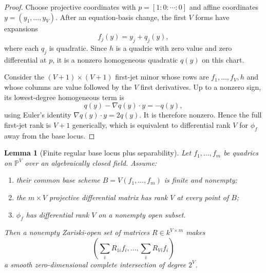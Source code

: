 \documentclass[10pt,a4paper]{article}
\newtheorem{lemma}[theorem]{Lemma}
\newcommand{\PP}{\mathbb P}
\begin{document}
\begin{proof}
Choose projective coordinates with $p=[1:0:\cdots:0]$ and affine coordinates $y=(y_1,\ldots,y_V)$.  After an equation-basis change, the first $V$ forms have expansions
\[
f_j(y)=y_j+q_j(y),
\]
where each $q_j$ is quadratic.  Since $h$ is a quadric with zero value and zero differential at $p$, it is a nonzero homogeneous quadratic $q(y)$ on this chart.

Consider the $(V+1)\times(V+1)$ first-jet minor whose rows are $f_1,\ldots,f_V,h$ and whose columns are value followed by the $V$ first derivatives.  Up to a nonzero sign, its lowest-degree homogeneous term is
\[
q(y)-\nabla q(y)\cdot y=-q(y),
\]
using Euler's identity $\nabla q(y)\cdot y=2q(y)$.  It is therefore nonzero.  Hence the full first-jet rank is $V+1$ generically, which is equivalent to differential rank $V$ for $\phi_f$ away from the base locus.
\end{proof}

\begin{lemma}[Finite regular base locus plus separability]\label{lem:finite-base-mixing}
Let $f_1,\ldots,f_m$ be quadrics on $\PP^V$ over an algebraically closed field.  Assume:
\begin{enumerate}
\item their common base scheme $B=V(f_1,\ldots,f_m)$ is finite and nonempty;
\item the $m\times V$ projective differential matrix has rank $V$ at every point of $B$;
\item $\phi_f$ has differential rank $V$ on a nonempty open subset.
\end{enumerate}
Then a nonempty Zariski-open set of matrices $R\in k^{V\times m}$ makes
\[
\left(\sum_iR_{1i}f_i,\ldots,\sum_iR_{Vi}f_i\right)
\]
a smooth zero-dimensional complete intersection of degree $2^V$.
\end{lemma}
\end{document}

